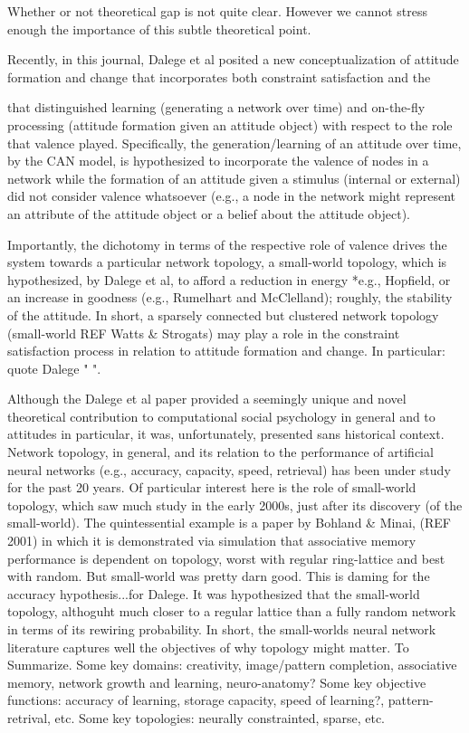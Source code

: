 \documentclass{article}
\begin{document}
Whether or not theoretical gap is not quite clear. However we cannot stress enough the importance of this subtle theoretical point.  

Recently, in this journal, Dalege et al posited a new conceptualization of attitude formation and change that incorporates both constraint satisfaction and the 

that distinguished learning (generating a network over time) and on-the-fly processing (attitude formation given an attitude object) with respect to the role that valence played.  Specifically, the generation/learning of an attitude over time, by the CAN model,  is hypothesized to incorporate the valence of nodes in a network while the formation of an attitude given a stimulus (internal or external) did not consider valence whatsoever (e.g., a node in the network might represent an attribute of the attitude object or a belief about the attitude object).  

Importantly, the dichotomy in terms of the respective role of valence drives the system towards a particular network topology, a small-world topology, which is hypothesized, by Dalege et al, to afford a reduction in energy *e.g., Hopfield, or an increase in goodness (e.g., Rumelhart and McClelland); roughly, the stability of the attitude.  In short, a sparsely connected but clustered network topology (small-world REF Watts \& Strogats) may play a role in the constraint satisfaction process in relation to attitude formation and change.   In particular:  quote Dalege " ".  

Although the Dalege et al paper provided a seemingly unique and novel theoretical contribution to computational social psychology in general and to attitudes in particular, it was, unfortunately, presented sans historical context.  Network topology, in general, and its relation to the performance of artificial neural networks (e.g., accuracy, capacity, speed, retrieval) has been under study for the past 20 years. Of particular interest here is the role of small-world topology, which saw much study in the early 2000s, just after its discovery (of the small-world).  The quintessential example is a paper by Bohland \& Minai, (REF 2001) in which it is demonstrated via simulation that associative memory performance is dependent on topology, worst with regular ring-lattice and best with random.  But small-world was pretty darn good. This is daming for the accuracy hypothesis...for Dalege. It was hypothesized that the small-world topology, althoguht much closer to a regular lattice than a fully random network in terms of its rewiring probability.  In short, the small-worlds neural network literature captures well the objectives of why topology might matter.  To Summarize. Some key domains: creativity, image/pattern completion, associative memory, network growth and learning, neuro-anatomy?  Some key objective functions: accuracy of learning, storage capacity, speed of learning?, pattern-retrival, etc.  Some key topologies:  neurally constrainted, sparse, etc.   
\end{document}
